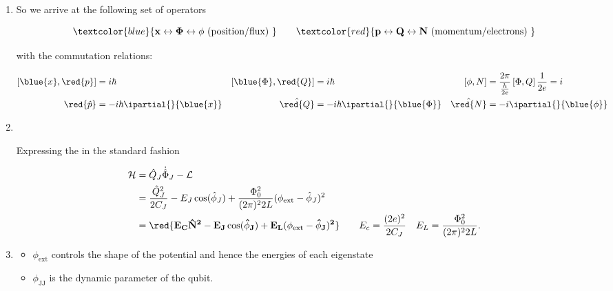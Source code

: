 \begin{enumerate}
\item So we arrive at the following set of operators

  \begin{equation}
    { \textcolor{blue}{\mathbf{x\leftrightarrow \Phi \leftrightarrow \phi} \text{ (position/flux) }}\qquad \textcolor{red}{\mathbf{p\leftrightarrow Q \leftrightarrow N \text{ (momentum/electrons) }}}}
  \end{equation}

  \noindent with the commutation relations:

  \begin{align}
    \left[\blue{x},\red{p}\right] & =i\hbar & \left[\blue{\Phi},\red{Q}\right] & = i\hbar & \left[\phi,N\right] & = \frac{2\pi}{\frac{h}{2e}}\left[\Phi,Q\right]\frac{1}{2e} = i\\
    \red{\hat{p}} & = -i\hbar\ipartial{}{\blue{x}} & \hat{\red{Q}} & =-i\hbar\ipartial{}{\blue{\Phi}} & \hat{\red{N}} & =-i\ipartial{}{\blue{\phi}}
  \end{align}

\item\

\begin{framed}\noindent
  Expressing the  in the standard fashion

  \begin{equation}
    \begin{aligned}
      \mathcal{H} & = \hat{Q}_J\dot{\hat{\Phi}}_J - \mathcal{L}\\
      & = \frac{\hat{Q}_J^2}{2C_J} - E_J\cos(\hat{\phi}_J) + \frac{\Phi_0^2}{(2\pi)^22L}(\phi_\text{ext}-\hat{\phi}_J)^2\\
      &   =   \mathbf{\red{E_C{\hat{N}^2}-  E_J\cos(\hat{\phi}_J)   +
          E_L(\phi_\text{ext}-\hat{\phi}_J)^2}}\qquad      E_c      =
      \frac{(2e)^2}{2C_J}\quad E_L = \frac{\Phi_0^2}{(2\pi)^22L}.
    \end{aligned}
  \end{equation}
\end{framed}

\item{}
  \begin{itemize}
  \item $ \phi_{\text{ext}} $ controls the shape of the potential and
    hence the energies of each eigenstate
  \item $ \phi_{\text{JJ}} $ is the dynamic parameter of the qubit.
  \end{itemize}
\end{enumerate}

